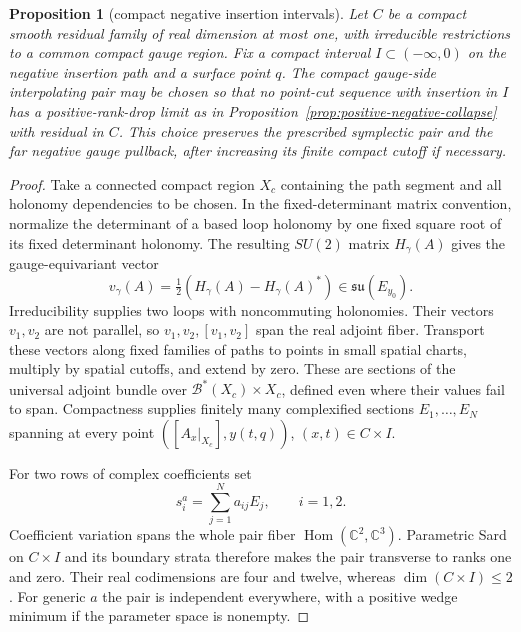 \documentclass[11pt]{amsart}
\newtheorem{proposition}[theorem]{Proposition}
\theoremstyle{definition}
\theoremstyle{remark}
\theoremstyle{plain}
\begin{document}
\begin{proposition}[compact negative insertion intervals]
\label{prop:positive-negative-incidence}
Let $C$ be a compact smooth residual family of real dimension
at most one, with irreducible restrictions to a common compact
gauge region. Fix a compact interval $I\subset(-\infty,0)$
on the negative insertion path and a surface point $q$.
The compact gauge-side interpolating pair may be chosen so
that no point-cut sequence with insertion in $I$ has a
positive-rank-drop limit as in
Proposition~\ref{prop:positive-negative-collapse} with
residual in $C$. This choice preserves the prescribed
symplectic pair and the far negative gauge pullback, after
increasing its finite compact cutoff if necessary.
\end{proposition}

\begin{proof}
Take a connected compact region $X_c$ containing the path
segment and all holonomy dependencies to be chosen. In the
fixed-determinant matrix convention, normalize the determinant
of a based loop holonomy by one fixed square root of its
fixed determinant holonomy. The resulting $SU(2)$ matrix
$H_\gamma(A)$ gives the gauge-equivariant vector
\[
                 v_\gamma(A)=\tfrac12(H_\gamma(A)-H_\gamma(A)^*)
                       \in\mathfrak{su}(E_{y_0}).
\]
Irreducibility supplies two loops with noncommuting holonomies.
Their vectors $v_1,v_2$ are not parallel, so
$v_1,v_2,[v_1,v_2]$ span the real adjoint fiber.
Transport these vectors along fixed families of paths to
points in small spatial charts, multiply by spatial cutoffs,
and extend by zero. These are sections of the universal
adjoint bundle over $\mathcal B^*(X_c)\times X_c$,
defined even where their values fail to span.
Compactness supplies finitely many complexified sections
$E_1,\ldots,E_N$ spanning at every point
$([A_x|_{X_c}],y(t,q))$, $(x,t)\in C\times I$.

For two rows of complex coefficients set
\begin{equation}\label{eq:negative-holonomy-pair}
                         s_i^a=\sum_{j=1}^N a_{ij}E_j,
                                  \qquad i=1,2.
\end{equation}
Coefficient variation spans the whole pair fiber
$\operatorname{Hom}(\mathbb C^2,\mathbb C^3)$.
Parametric Sard on $C\times I$ and its boundary strata
therefore makes the pair transverse to ranks one and zero.
Their real codimensions are four and twelve, whereas
$\dim(C\times I)\leq2$. For generic $a$ the pair is
independent everywhere, with a positive wedge minimum
if the parameter space is nonempty.


\end{proof}
\end{document}
